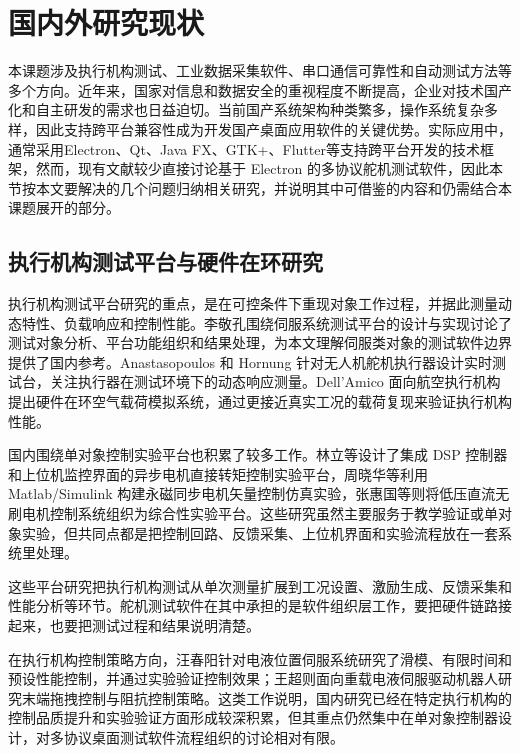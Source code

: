 \section{国内外研究现状}

本课题涉及执行机构测试、工业数据采集软件、串口通信可靠性和自动测试方法等多个方向。近年来，国家对信息和数据安全的重视程度不断提高，企业对技术国产化和自主研发的需求也日益迫切。当前国产系统架构种类繁多，操作系统复杂多样，因此支持跨平台兼容性成为开发国产桌面应用软件的关键优势。实际应用中，通常采用Electron、Qt、Java FX、GTK+、Flutter等支持跨平台开发的技术框架，然而，现有文献较少直接讨论基于 Electron 的多协议舵机测试软件，因此本节按本文要解决的几个问题归纳相关研究，并说明其中可借鉴的内容和仍需结合本课题展开的部分。

\subsection{执行机构测试平台与硬件在环研究}

执行机构测试平台研究的重点，是在可控条件下重现对象工作过程，并据此测量动态特性、负载响应和控制性能。李敬孔围绕伺服系统测试平台的设计与实现讨论了测试对象分析、平台功能组织和结果处理，为本文理解伺服类对象的测试软件边界提供了国内参考\cite{li2014servotest}。Anastasopoulos 和 Hornung 针对无人机舵机执行器设计实时测试台，关注执行器在测试环境下的动态响应测量\cite{anastasopoulos2018uavbench}。Dell'Amico 面向航空执行机构提出硬件在环空气载荷模拟系统，通过更接近真实工况的载荷复现来验证执行机构性能\cite{dellamico2024airloadhil}。

国内围绕单对象控制实验平台也积累了较多工作。林立等设计了集成 DSP 控制器和上位机监控界面的异步电机直接转矩控制实验平台，周晓华等利用 Matlab/Simulink 构建永磁同步电机矢量控制仿真实验，张惠国等则将低压直流无刷电机控制系统组织为综合性实验平台\cite{lin2025dtcplatform,zhou2020pmsmexperiment,zhang2016bldcexperiment}。这些研究虽然主要服务于教学验证或单对象实验，但共同点都是把控制回路、反馈采集、上位机界面和实验流程放在一套系统里处理。

这些平台研究把执行机构测试从单次测量扩展到工况设置、激励生成、反馈采集和性能分析等环节。舵机测试软件在其中承担的是软件组织层工作，要把硬件链路接起来，也要把测试过程和结果说明清楚。

在执行机构控制策略方向，汪春阳针对电液位置伺服系统研究了滑模、有限时间和预设性能控制，并通过实验验证控制效果；王超则面向重载电液伺服驱动机器人研究末端拖拽控制与阻抗控制策略\cite{wang2025electrohydraulicsmc,wang2025hydraulicdrag}。这类工作说明，国内研究已经在特定执行机构的控制品质提升和实验验证方面形成较深积累，但其重点仍然集中在单对象控制器设计，对多协议桌面测试软件流程组织的讨论相对有限。

